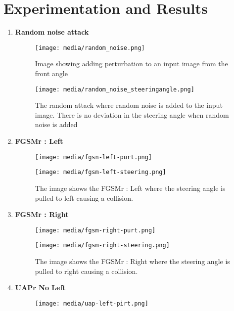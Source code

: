 \documentclass[ 12pt,a4paper,twocolumn,fleqn]{article}
\begin{document}
\section{Experimentation and Results}
\begin{enumerate}
    \item \textbf{Random noise attack}
    \begin{figure}[H]
    \texttt{[image: media/random\_noise.png]}
    \centering
    \caption{Image showing adding perturbation to an input image from the front angle}
    \end{figure}

    \begin{figure}[H]
    \texttt{[image: media/random\_noise\_steeringangle.png]}
    \centering
    \caption{The random attack where random noise is added to the input image.
    There is no deviation in the steering angle when random noise is added}
    \end{figure}
    
    \item \textbf{FGSMr : Left}
    \begin{figure}[H]
    \texttt{[image: media/fgsn-left-purt.png]}
    \centering
    \end{figure}
    
    \begin{figure}[H]
    \texttt{[image: media/fgsm-left-steering.png]}
    \centering
    \caption{The image shows the FGSMr : Left where the steering angle is pulled to left causing a collision.}
    \end{figure}
    
    \item \textbf{FGSMr : Right}
    \begin{figure}[H]
    \texttt{[image: media/fgsm-right-purt.png]}
    \centering
    \end{figure}
    
    \begin{figure}[H]
    \texttt{[image: media/fgsm-right-steering.png]}
    \centering
    \caption{The image shows the FGSMr : Right where the steering angle is pulled to right causing a collision.}
    \end{figure}
    
    \item \textbf{UAPr No Left}
    
    \begin{figure}[H]
    \texttt{[image: media/uap-left-pirt.png]}
    \centering
    \end{figure}
    

\end{enumerate}
\end{document}
